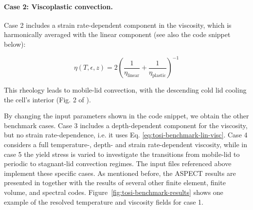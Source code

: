 \documentclass{article}
\newcommand{\aspect}{\textsc{ASPECT}}
\begin{document}
\paragraph{Case 2: Viscoplastic convection.}
\label{sec:benchmark-tosi-case-2}
Case 2 includes a strain rate-dependent component in the viscosity, which is harmonically averaged with the linear component (see also the code snippet below):

\begin{equation}
  \eta(T,\epsilon,z) = 2 \left(\frac{1}{\eta_\text{linear}}+\frac{1}{\eta_\text{plastic}}\right)^{-1}
  \label{eq:tosi-benchmark-ave-visc}
\end{equation}



This rheology leads to mobile-lid convection, with the descending cold lid cooling the cell's interior (Fig. 2 of \cite{T15}).

By changing the input parameters shown in the code snippet, we obtain the other benchmark cases.
Case 3 includes a depth-dependent component for the viscosity, but no strain rate-dependence, i.e. it uses Eq. \eqref{eq:tosi-benchmark-lin-visc}. Case 4 considers a full temperature-, depth- and strain rate-dependent viscosity, while in case 5 the yield stress is varied to investigate the transitions from mobile-lid to periodic to stagnant-lid convection regimes.
The input files referenced above implement these specific cases. As mentioned before, the \aspect{} results are presented in \cite{T15} together with the results of several other finite element, finite volume, and spectral codes. Figure~\ref{fig:tosi-benchmark-results} shows one example of the resolved temperature and viscosity fields for case 1. 	
\end{document}
